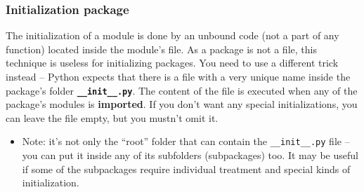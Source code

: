 \documentclass[11pt]{article}
\begin{document}
\subsubsection{Initialization package}
\label{sec:org354fadc}
The initialization of a module is done by an unbound code (not a part
of any function) located inside the module’s file. As a package is not
a file, this technique is useless for initializing packages. You need
to use a different trick instead – Python expects that there is a file
with a very unique name inside the package’s folder \textbf{\texttt{\_\_init\_\_.py}}.
The content of the file is executed when any of the package’s modules
is \textbf{imported}. If you don’t want any special initializations, you can
leave the file empty, but you mustn’t omit it.


\begin{itemize}
\item Note: it’s not only the “root” folder that can contain the
\texttt{\_\_init\_\_.py} file – you can put it inside any of its subfolders
(subpackages) too. It may be useful if some of the subpackages require
individual treatment and special kinds of initialization.
\end{itemize}
\end{document}
